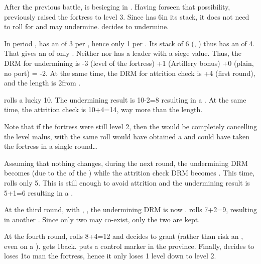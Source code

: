 \begin{exemple}[Undermining]
  After the previous battle, \FRA is besieging \villeArras in
  \provinceArtois. Having forseen that possibility, \HIS previously raised the
  fortress to level 3. Since \FRA has 6\LD in its stack, it does not need to
  roll for  and may undermine. \FRA decides to
  undermine.

  In period , \FRA has an  of 3 per
  \ARMY\faceplus, hence only 1 per \ARMY\facemoins. Its stack of 6\LD
  (\ARMY\faceplus, \ARMY\facemoins) thus has an  of
  4. That gives an  of only . Neither \FRA
  nor \HIS has a leader with a siege value. Thus, the DRM for undermining is
  -3 (level of the fortress) +1 (Artillery bonus) +0 (plain, no port) = -2. At
  the same time, the DRM for attrition check is +4 (first round), and the \LoS
  length is 2\MP from \villeParis.

  \FRA rolls a lucky 10. The undermining result is 10-2=8 resulting in a
  \USURE\faceplus. At the same time, the attrition check is 10+4=14, way more
  than the \LoS length.

  Note that if the fortress were still level 2, then the  would be  completely cancelling the level malus, with the
  same roll \FRA would have obtained a  and could have taken the
  fortress in a single round\ldots

  \smallskip

  Assuming that nothing changes, during the next round, the undermining DRM
  becomes  (due to the  of the \USURE\faceplus) while the
  attrition check DRM becomes . This time, \FRA rolls only 5. This is
  still enough to avoid attrition and the undermining result is 5+1=6
  resulting in a \USURE\facemoins.

  At the third round, with \USURE\faceplus, \USURE\facemoins, the undermining
  DRM is now . \FRA rolls 7+2=9, resulting in another
  \USURE\faceplus. Since only two \USURE may co-exist, only the two \Faceplus
  are kept.

  At the fourth round, \FRA rolls 8+4=12 and decides to grant \HIS {} (rather than risk an , even on a
  ). \HIS gets 1\LD back. \FRA puts a control marker in the
  province. Finally, \FRA decides to loses 1\LD to man the fortress, hence it
  only loses 1 level down to level 2.
\end{exemple}

